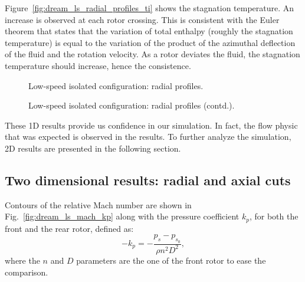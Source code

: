 Figure~\ref{fig:dream_ls_radial_profiles_ti}
shows the stagnation temperature.
An increase is observed at each 
rotor crossing. This is consistent with the
Euler theorem that states that the variation of total enthalpy (roughly
the stagnation temperature) is equal to the variation of the product of
the azimuthal deflection of the fluid and the rotation velocity. As a rotor
deviates the fluid, the stagnation temperature should increase, 
hence the consistence.
\begin{figure}[htp]
  \centering
  \caption{Low-speed isolated configuration: radial profiles.}
\end{figure}
\begin{figure}[htp]
  \centering
  \setcounter{subfigure}{3}
  \caption{Low-speed isolated configuration: radial profiles (contd.).}
  \label{fig:dream_ls_radial_profiles}
\end{figure}

These 1D results provide us confidence in our simulation. 
In fact, the flow physic that
was expected is observed in the results. To further analyze the simulation,
2D results are presented in the following section.

\subsection{Two dimensional results: radial and axial cuts}
\label{sub:dream_ls_flow_field}

Contours of the relative Mach number are shown in 
Fig.~\ref{fig:dream_ls_mach_kp} along with the pressure coefficient $k_p$,
for both the front and the rear rotor, defined as:
\begin{equation}
   -k_p = - \frac{p_s - p_{s_0}}{\rho n^2 D^2},
\end{equation}
where the $n$ and $D$ parameters are the one of the front rotor
to ease the comparison.

